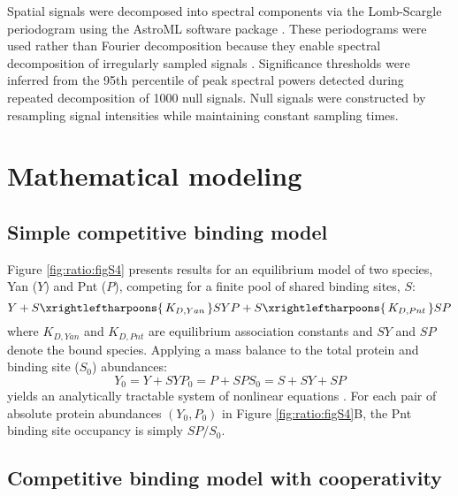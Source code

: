 Spatial signals were decomposed into spectral components via the Lomb-Scargle periodogram using the AstroML software package \cite{VanderPlas2012}. These periodograms were used rather than Fourier decomposition because they enable spectral decomposition of irregularly sampled signals \cite{VanderPlas2018}. Significance thresholds were inferred from the 95th percentile of peak spectral powers detected during repeated decomposition of 1000 null signals. Null signals were constructed by resampling signal intensities while maintaining constant sampling times.

\newpage

\section{Mathematical modeling}

\subsection{Simple competitive binding model}
\label{appendix:methods:ratio:simple_model}

Figure \ref{fig:ratio:figS4} presents results for an equilibrium model of two species, Yan ($Y$) and Pnt ($P$), competing for a finite pool of shared binding sites, $S$:
\begin{equation}
Y + S \xrightleftharpoons{\,K_{D,Yan}\,} SY
P + S \xrightleftharpoons{\,K_{D,Pnt}\,} SP
\end{equation}
where $K_{D,Yan}$ and $K_{D,Pnt}$ are equilibrium association constants and $SY$ and $SP$ denote the bound species. Applying a mass balance to the total protein and binding site ($S_0$) abundances:
\begin{equation}
Y_0 = Y + SY
P_0 = P + SP
S_0 = S + SY + SP
\end{equation}
yields an analytically tractable system of nonlinear equations \cite{Wang1995}. For each pair of absolute protein abundances $(Y_0,P_0)$ in Figure \ref{fig:ratio:figS4}B, the Pnt binding site occupancy is simply $SP/S_0$.

\subsection{Competitive binding model with cooperativity}
\label{appendix:methods:ratio:competitive_model}

